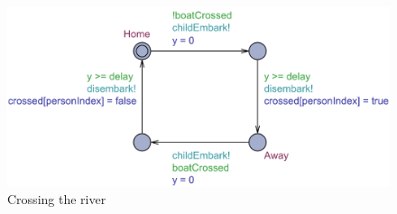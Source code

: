 \documentclass[a4paper,12pt]{article}
\begin{document}
\begin{figure}[H]
\centering
\includegraphics[width=\linewidth]{Child.pdf}
\caption{Crossing the river}
\end{figure}
\end{document}
